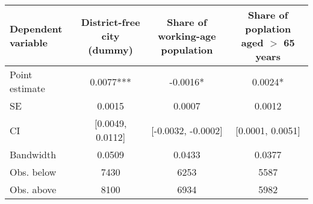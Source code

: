 \begin{tabular}{lccc}
  \toprule
 \midrule
Dependent variable & District-free city (dummy) & Share of working-age population & Share of poplation aged $>$ 65 years \\ 
  \midrule
Point estimate & 0.0077*** & -0.0016* & 0.0024* \\ 
  SE &  0.0015 &  0.0007 &  0.0012 \\ 
  CI & [0.0049, 0.0112] & [-0.0032, -0.0002] & [0.0001, 0.0051] \\ 
   \midrule
Bandwidth & 0.0509 & 0.0433 & 0.0377 \\ 
  Obs. below &  7430 &  6253 &  5587 \\ 
  Obs. above &  8100 &  6934 &  5982 \\ 
   \midrule
 \bottomrule
\end{tabular}
